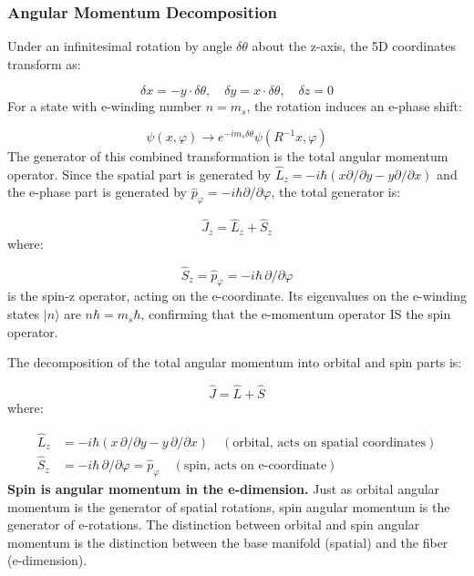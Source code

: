 \documentclass[aps,prd,preprint,superscriptaddress,longbibliography,floatfix]{revtex4-2}
\theoremstyle{remark}
\begin{document}
\subsubsection{Angular Momentum Decomposition}

Under an infinitesimal rotation by angle $\delta\theta$ about the z-axis, the 5D coordinates transform as:


\begin{equation}
    \delta x = -y \cdot \delta\theta, \quad \delta y = x \cdot \delta\theta, \quad \delta z = 0
\end{equation}
For a state with e-winding number $n = m_s$, the rotation induces an e-phase shift:


\begin{equation}
    \psi(x, \varphi) \to e^{-im_s \delta\theta} \psi(R^{-1} x, \varphi)
\end{equation}
The generator of this combined transformation is the total angular momentum operator. Since the spatial part is generated by $\hat{L}_z = -i\hbar(x \partial/\partial y - y \partial/\partial x)$ and the e-phase part is generated by $\hat{p}_\varphi = -i\hbar \partial/\partial\varphi$, the total generator is:


\begin{equation}
    \hat{J}_z = \hat{L}_z + \hat{S}_z
\end{equation}
where:


\begin{equation}
    \hat{S}_z = \hat{p}_\varphi = -i\hbar \, \partial/\partial\varphi
\end{equation}
is the spin-z operator, acting on the e-coordinate. Its eigenvalues on the e-winding states $|n\rangle$ are $n\hbar = m_s \hbar$, confirming that the e-momentum operator IS the spin operator.

The decomposition of the total angular momentum into orbital and spin parts is:


\begin{equation}
    \hat{J} = \hat{L} + \hat{S}
\end{equation}
where:


\begin{align}
    \hat{L}_z &= -i\hbar (x \, \partial/\partial y - y \, \partial/\partial x)     \quad (\text{orbital, acts on spatial coordinates}) \\
    \hat{S}_z &= -i\hbar \, \partial/\partial\varphi = \hat{p}_\varphi     \quad (\text{spin, acts on e-coordinate})
\end{align}
\textbf{Spin is angular momentum in the e-dimension.} Just as orbital angular momentum is the generator of spatial rotations, spin angular momentum is the generator of e-rotations. The distinction between orbital and spin angular momentum is the distinction between the base manifold (spatial) and the fiber (e-dimension).
\end{document}
